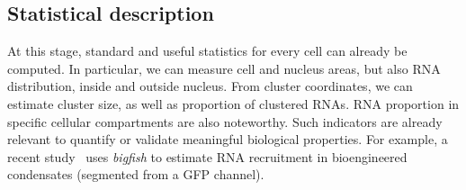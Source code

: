 


\subsection{Statistical description}

At this stage, standard and useful statistics for every cell can already be computed.
In particular, we can measure cell and nucleus areas, but also \ac{RNA} distribution, inside and outside nucleus.
From cluster coordinates, we can estimate cluster size, as well as proportion of clustered \ac{RNA}s.
\ac{RNA} proportion in specific cellular compartments are also noteworthy.
Such indicators are already relevant to quantify or validate meaningful biological properties.
For example, a recent study~\cite{cochard_rna_2022} uses \emph{bigfish} to estimate \ac{RNA} recruitment in bioengineered condensates (segmented from a \ac{GFP} channel).\\

